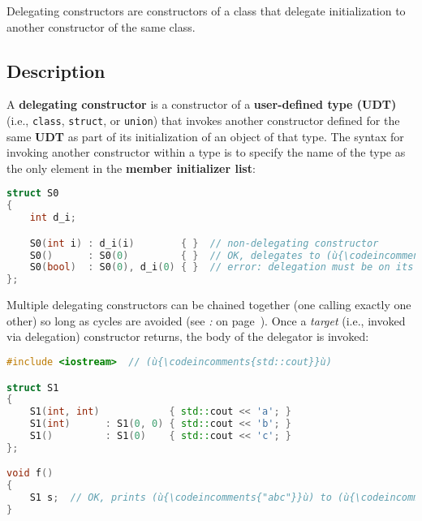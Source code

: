 

Delegating constructors are constructors of a class that delegate initialization to another
constructor of the same class.

\subsection[Description]{Description}\label{description}

A \textbf{delegating constructor} is a constructor of a
\textbf{user-defined type (UDT)} (i.e., \texttt{class}, \texttt{struct}, or
\texttt{union}) that invokes another constructor defined for the same
\textbf{UDT} as part of its initialization of an object of that type.
The syntax for invoking another constructor within a type is to specify
the name of the type as the only element in the \textbf{member
initializer list}:

\begin{lstlisting}[language=C++]
struct S0
{
    int d_i;

    S0(int i) : d_i(i)        { }  // non-delegating constructor
    S0()      : S0(0)         { }  // OK, delegates to (ù{\codeincomments{S0(int)}}ù)
    S0(bool)  : S0(0), d_i(0) { }  // error: delegation must be on its own
};
\end{lstlisting}
    
\noindent Multiple delegating constructors can be chained together (one calling
exactly one other) so long as cycles are avoided (see
{\it{}:} {\it{}} on page~\pageref{delegation-cycles}). Once a \emph{target} (i.e., invoked via delegation) constructor returns,
the body of the delegator is invoked:

\begin{lstlisting}[language=C++]
#include <iostream>  // (ù{\codeincomments{std::cout}}ù)

struct S1
{
    S1(int, int)            { std::cout << 'a'; }
    S1(int)      : S1(0, 0) { std::cout << 'b'; }
    S1()         : S1(0)    { std::cout << 'c'; }
};

void f()
{
    S1 s;  // OK, prints (ù{\codeincomments{"abc"}}ù) to (ù{\codeincomments{stdout}}ù)
}
\end{lstlisting}
    
